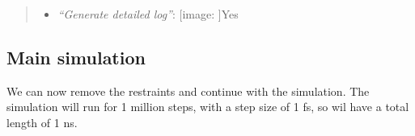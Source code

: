\documentclass[twocolumn]{bmcart}%
\def\texttt{[image: ]}
\providecommand{\tightlist}{%
  \setlength{\itemsep}{0pt}\setlength{\parskip}{0pt}}
\begin{document}
\begin{quote}
\begin{enumerate}
\begin{itemize}
\begin{itemize}
      \begin{itemize}
      \tightlist
      \item
        \emph{``Bond constraints (constraints)''}:
        \texttt{All\ bonds\ (all-bonds).}
      \item
        \emph{``Temperature /K''}: \texttt{300}
      \item
        \emph{``Step length in ps''}: \texttt{0.002}
      \item
        \emph{``Number of steps that elapse between saving data points
        (velocities, forces, energies)''}: \texttt{1000}
      \item
        \emph{``Number of steps for the simulation''}: \texttt{50000}
      \end{itemize}
    \end{itemize}
  \item
    \emph{``Generate detailed log''}: \texttt{Yes}
  \end{itemize}
\end{enumerate}


\end{quote}

\hypertarget{main-simulation}{%
\subsection{Main simulation}\label{main-simulation}}

We can now remove the restraints and continue with the simulation. The
simulation will run for 1 million steps, with a step size of 1 fs, so
wil have a total length of 1 ns.
\end{document}
